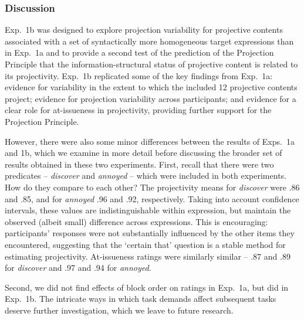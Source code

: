 \documentclass[11pt,fleqn]{article}
\newcommand{\6}{\mbox{$[\hspace*{-.6mm}[$}}
\newcommand{\9}{\mbox{$]\hspace*{-.6mm}]$}}
\begin{document}
\subsubsection{Discussion}

Exp.~1b was designed to explore projection variability for projective contents associated with a set of syntactically more homogeneous target expressions than in Exp.~1a and to provide a second test of the prediction of the Projection Principle  that the information-structural status of projective content is related to its projectivity. Exp.~1b replicated some of the key findings from Exp.~1a: evidence for variability in the extent to which the included 12 projective contents project;  evidence for projection variability across participants; and evidence for a clear role for at-issueness in projectivity, providing further support for the Projection Principle. 

However, there were also some minor differences between the results of Exps.~1a and 1b, which we examine in more detail before discussing the broader set of results obtained in these two experiments. First, recall that there were two predicates -- \emph{discover} and \emph{annoyed} -- which were included in both experiments. How do they compare to each other? The projectivity means for \emph{discover} were .86 and .85, and for \emph{annoyed} .96 and .92, respectively. Taking into account confidence intervals, these values are indistinguishable within expression, but maintain the observed (albeit small) difference across expressions. This is encouraging: participants' responses were not substantially influenced by the other items they encountered, suggesting that the `certain that' question is a stable method for estimating projectivity. At-issueness ratings were similarly similar -- .87 and .89 for \emph{discover} and .97 and .94 for \emph{annoyed}.


Second, we did not find effects of block order on ratings in Exp.~1a, but did in Exp.~1b. The intricate ways in which task demands affect subsequent tasks deserve further investigation, which we leave to future research.
\end{document}
